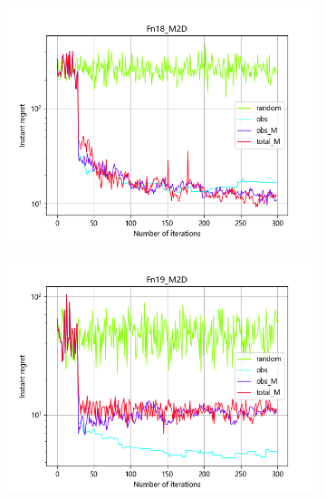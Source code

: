 \documentclass{article}
\begin{document}
\begin{figure}[H]
\begin{subfigure}[t]{.32\linewidth}
        \includegraphics[width=1\textwidth]{pictures/Homo_noise_2D_onlyEI/Fn18_M2D_ins.png}
    \end{subfigure}
    \begin{subfigure}[t]{.32\linewidth}
        \centering
        \includegraphics[width=1\textwidth]{pictures/Homo_noise_2D_onlyEI/Fn19_M2D_ins.png}
    \end{subfigure}
    \begin{subfigure}[t]{.32\linewidth}
        \centering

\end{subfigure}
\end{figure}
\end{document}
